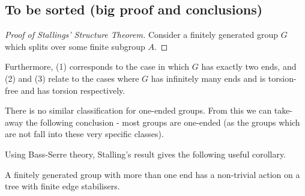 \subsection{To be sorted (big proof and conclusions)}



\begin{proof}[Proof of Stallings' Structure Theorem]
    Consider a finitely generated group \(G\) which splits over some finite subgroup \(A\).
\end{proof}

\begin{corollary}
    Furthermore, (1) corresponds to the case in which \(G\) has exactly two ends, and (2) and (3) relate to the cases where \(G\) has infinitely many ends and is torsion-free and has torsion respectively. 
\end{corollary}

There is no similar classification for one-ended groups. From this we can take-away the following conclusion - most groups are one-ended (as the groups which are not fall into these very specific classes).

Using Bass-Serre theory, Stalling's result gives the following useful corollary. %
\begin{corollary}
    A finitely generated group with more than one end has a non-trivial action on a tree with finite edge stabilisers.
\end{corollary}
\newpage %